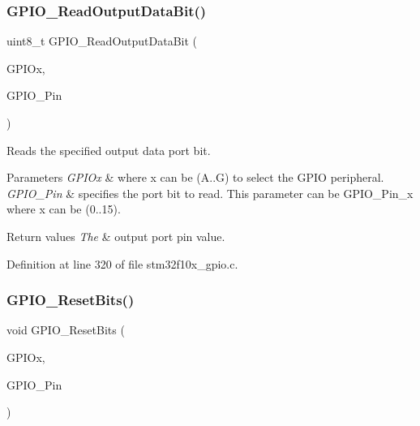 \subsubsection{\texorpdfstring{G\+P\+I\+O\+\_\+\+Read\+Output\+Data\+Bit()}{GPIO\_ReadOutputDataBit()}}
{\footnotesize\ttfamily uint8\+\_\+t G\+P\+I\+O\+\_\+\+Read\+Output\+Data\+Bit (\begin{DoxyParamCaption}\item[{\hyperlink{struct_g_p_i_o___type_def}{G\+P\+I\+O\+\_\+\+Type\+Def} $\ast$}]{G\+P\+I\+Ox,  }\item[{uint16\+\_\+t}]{G\+P\+I\+O\+\_\+\+Pin }\end{DoxyParamCaption})}



Reads the specified output data port bit. 


\begin{DoxyParams}{Parameters}
{\em G\+P\+I\+Ox} & where x can be (A..G) to select the G\+P\+IO peripheral. \\
\hline
{\em G\+P\+I\+O\+\_\+\+Pin} & specifies the port bit to read. This parameter can be G\+P\+I\+O\+\_\+\+Pin\+\_\+x where x can be (0..15). \\
\hline
\end{DoxyParams}

\begin{DoxyRetVals}{Return values}
{\em The} & output port pin value. \\
\hline
\end{DoxyRetVals}


Definition at line 320 of file stm32f10x\+\_\+gpio.\+c.

\mbox{\label{group___g_p_i_o___private___functions_ga6fcd35b207a66608dd2c9d7de9247dc8}} 
\subsubsection{\texorpdfstring{G\+P\+I\+O\+\_\+\+Reset\+Bits()}{GPIO\_ResetBits()}}
{\footnotesize\ttfamily void G\+P\+I\+O\+\_\+\+Reset\+Bits (\begin{DoxyParamCaption}\item[{\hyperlink{struct_g_p_i_o___type_def}{G\+P\+I\+O\+\_\+\+Type\+Def} $\ast$}]{G\+P\+I\+Ox,  }\item[{uint16\+\_\+t}]{G\+P\+I\+O\+\_\+\+Pin }\end{DoxyParamCaption})}



